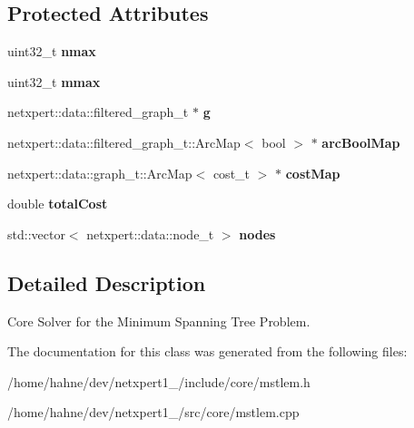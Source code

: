 \subsection*{Protected Attributes}
\begin{DoxyCompactItemize}
\item 
uint32\+\_\+t {\bfseries nmax}\hypertarget{classnetxpert_1_1core_1_1MST__LEMON_af744d50412381bf3ea0db8c31f423bef}{}\label{classnetxpert_1_1core_1_1MST__LEMON_af744d50412381bf3ea0db8c31f423bef}

\item 
uint32\+\_\+t {\bfseries mmax}\hypertarget{classnetxpert_1_1core_1_1MST__LEMON_a127b7968693376541d8f7c3bc194c3d1}{}\label{classnetxpert_1_1core_1_1MST__LEMON_a127b7968693376541d8f7c3bc194c3d1}

\item 
netxpert\+::data\+::filtered\+\_\+graph\+\_\+t $\ast$ {\bfseries g}\hypertarget{classnetxpert_1_1core_1_1MST__LEMON_afe3845d96f722f393d33c7ee875de21e}{}\label{classnetxpert_1_1core_1_1MST__LEMON_afe3845d96f722f393d33c7ee875de21e}

\item 
netxpert\+::data\+::filtered\+\_\+graph\+\_\+t\+::\+Arc\+Map$<$ bool $>$ $\ast$ {\bfseries arc\+Bool\+Map}\hypertarget{classnetxpert_1_1core_1_1MST__LEMON_ad6c530c49c1aa798e50146db2e16e40a}{}\label{classnetxpert_1_1core_1_1MST__LEMON_ad6c530c49c1aa798e50146db2e16e40a}

\item 
netxpert\+::data\+::graph\+\_\+t\+::\+Arc\+Map$<$ cost\+\_\+t $>$ $\ast$ {\bfseries cost\+Map}\hypertarget{classnetxpert_1_1core_1_1MST__LEMON_ab727986bed0ab1d30f4b0ea5ed0ce46d}{}\label{classnetxpert_1_1core_1_1MST__LEMON_ab727986bed0ab1d30f4b0ea5ed0ce46d}

\item 
double {\bfseries total\+Cost}\hypertarget{classnetxpert_1_1core_1_1MST__LEMON_a36d5dd51e3318bf197afa794038556ef}{}\label{classnetxpert_1_1core_1_1MST__LEMON_a36d5dd51e3318bf197afa794038556ef}

\item 
std\+::vector$<$ netxpert\+::data\+::node\+\_\+t $>$ {\bfseries nodes}\hypertarget{classnetxpert_1_1core_1_1MST__LEMON_a782ecb13ad3260cbeb46f98cf2d77faa}{}\label{classnetxpert_1_1core_1_1MST__LEMON_a782ecb13ad3260cbeb46f98cf2d77faa}

\end{DoxyCompactItemize}


\subsection{Detailed Description}
Core Solver for the Minimum Spanning Tree Problem. 

The documentation for this class was generated from the following files\+:\begin{DoxyCompactItemize}
\item 
/home/hahne/dev/netxpert1\+\_/include/core/mstlem.\+h\item 
/home/hahne/dev/netxpert1\+\_/src/core/mstlem.\+cpp\end{DoxyCompactItemize}
